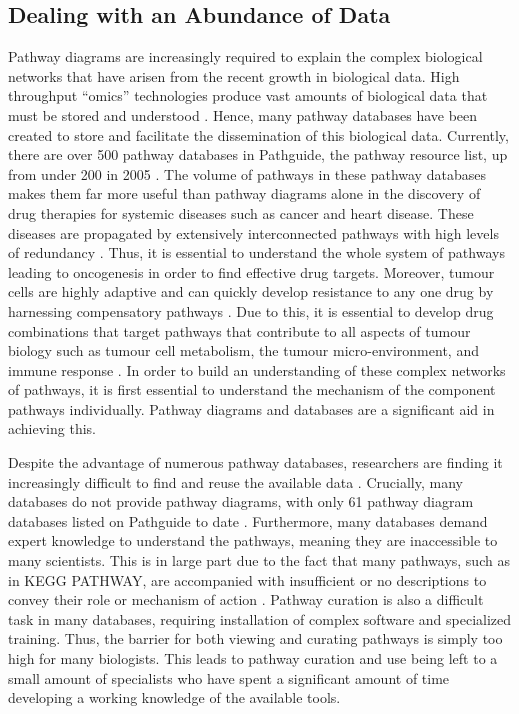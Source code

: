 \documentclass[a4paper,12pt,twoside]{apa}
\begin{document}
\subsection{Dealing with an Abundance of Data}
Pathway diagrams are increasingly required to explain the complex biological networks that have arisen from the recent growth in biological data. High throughput ``omics'' technologies produce vast amounts of biological data that must be stored and understood \cite{bohler2016reactome}. Hence, many pathway databases have been created to store and facilitate the dissemination of this biological data. Currently, there are over 500 pathway databases in Pathguide, the pathway resource list, up from under 200 in 2005 \cite{bader2006pathguide, cary2005pathway}. The volume of pathways in these pathway databases makes them far more useful than pathway diagrams alone in the discovery of drug therapies for systemic diseases such as cancer and heart disease. These diseases are propagated by extensively interconnected pathways with high levels of redundancy \cite{ryall2015systems}. Thus, it is essential to understand the whole system of pathways leading to oncogenesis in order to find effective drug targets. Moreover, tumour cells are highly adaptive and can quickly develop resistance to any one drug by harnessing compensatory pathways \cite{dry2016looking}. Due to this, it is essential to develop drug combinations that target pathways that contribute to all aspects of tumour biology such as tumour cell metabolism, the tumour micro-environment, and immune response \cite{ryall2015systems}. In order to build an understanding of these complex networks of pathways, it is first essential to understand the mechanism of the component pathways individually. Pathway diagrams and databases are a significant aid in achieving this.

Despite the advantage of numerous pathway databases, researchers are finding it increasingly difficult to find and reuse the available data \cite{dumontier2016health}. Crucially, many databases do not provide pathway diagrams, with only 61 pathway diagram databases listed on Pathguide to date \cite{bader2006pathguide}. Furthermore, many databases demand expert knowledge to understand the pathways, meaning they are inaccessible to many scientists. This is in large part due to the fact that many pathways, such as in KEGG PATHWAY, are accompanied with insufficient or no descriptions to convey their role or mechanism of action \cite{kanehisa2004kegg}. Pathway curation is also a difficult task in many databases, requiring installation of complex software and specialized training. Thus, the barrier for both viewing and curating pathways is simply too high for many biologists. This leads to pathway curation and use being left to a small amount of specialists who have spent a significant amount of time developing a working knowledge of the available tools.
\end{document}
